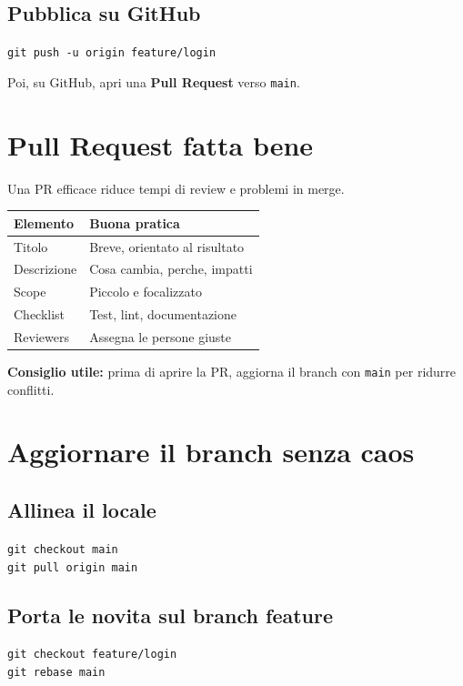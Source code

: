 \documentclass[a4paper,11pt]{article}
\begin{document}
\subsection{Pubblica su GitHub}
\begin{codebox}
\texttt{git push -u origin feature/login}
\end{codebox}

Poi, su GitHub, apri una \textbf{Pull Request} verso \texttt{main}.

\section{Pull Request fatta bene}
Una PR efficace riduce tempi di review e problemi in merge.

\begin{center}
\renewcommand{\arraystretch}{1.3}
\begin{tabularx}{\textwidth}{>{\ttfamily}l X}
\toprule
Elemento & Buona pratica \\
\midrule
Titolo & Breve, orientato al risultato \\
Descrizione & Cosa cambia, perche, impatti \\
Scope & Piccolo e focalizzato \\
Checklist & Test, lint, documentazione \\
Reviewers & Assegna le persone giuste \\
\bottomrule
\end{tabularx}
\end{center}

\begin{tipbox}
\textbf{Consiglio utile:} prima di aprire la PR, aggiorna il branch con \texttt{main} per ridurre conflitti.
\end{tipbox}

\section{Aggiornare il branch senza caos}
\subsection{Allinea il locale}
\begin{codebox}
\texttt{git checkout main} \\
\texttt{git pull origin main}
\end{codebox}

\subsection{Porta le novita sul branch feature}
\begin{codebox}
\texttt{git checkout feature/login} \\
\texttt{git rebase main}
\end{codebox}
\end{document}
